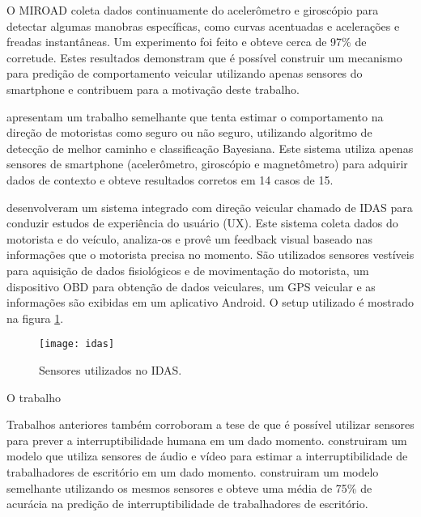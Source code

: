 O MIROAD coleta dados continuamente do acelerômetro e giroscópio para detectar algumas manobras específicas, como curvas acentuadas
e acelerações e freadas instantâneas.
Um experimento foi feito  e obteve cerca de 97\% de corretude. Estes resultados demonstram que é possível construir
um mecanismo para predição de comportamento veicular utilizando apenas sensores do smartphone e contribuem para a motivação deste trabalho.

 apresentam um trabalho semelhante que tenta estimar o comportamento na direção de motoristas como seguro ou
não seguro, utilizando algoritmo de detecção de melhor caminho e classificação Bayesiana. Este sistema utiliza
apenas sensores de smartphone (acelerômetro, giroscópio e magnetômetro) para adquirir dados de contexto e obteve
resultados corretos em 14 casos de 15.

 desenvolveram um sistema integrado com direção veicular chamado de IDAS para conduzir estudos de experiência
do usuário (UX). Este sistema coleta dados do motorista e do veículo, analiza-os e provê um feedback visual baseado
nas informações que o motorista precisa no momento. São utilizados sensores vestíveis para aquisição de dados
fisiológicos e de movimentação do motorista, um dispositivo OBD para obtenção de dados veiculares, um GPS veicular e as informações
são exibidas em um aplicativo Android. O setup utilizado é mostrado na figura \ref{idas}.

\begin{figure}[htb]
\centering
\texttt{[image: idas]}
\caption{Sensores utilizados no IDAS. \cite{park2016integrated}}
\label{idas}
\end{figure}

O trabalho

Trabalhos anteriores também corroboram a tese de que é possível utilizar sensores para prever a interruptibilidade
humana em um dado momento.  construiram um modelo que utiliza sensores de áudio e vídeo
para estimar a interruptibilidade de trabalhadores de escritório em um dado momento. 
construiram um modelo semelhante utilizando os mesmos sensores e obteve uma média de 75\% de acurácia na predição de
interruptibilidade de trabalhadores de escritório.
